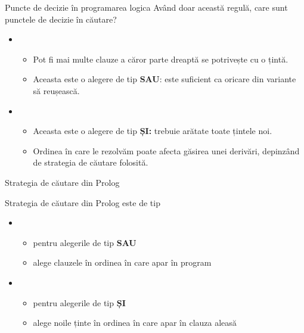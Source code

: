 \documentclass[xcolor=pdftex,romanian,colorlinks]{beamer}
\begin{document}
\begin{frame}{Puncte de decizie în programarea logica}
Având doar această regulă, care sunt punctele de decizie în căutare?
\begin{itemize}
   
  \item {}
  \begin{itemize}
    \item Pot fi mai multe clauze a căror parte dreaptă se potrivește cu o țintă.
    \item Aceasta este o alegere de tip \textbf{SAU}: este suficient ca oricare din variante să reușească.
  \end{itemize}
  
  \medskip  
  \item {}
  \begin{itemize}
    \item Aceasta este o alegere de tip \textbf{ȘI:} trebuie arătate toate țintele noi.
    \item Ordinea în care le rezolvăm poate afecta găsirea unei derivări, depinzând de strategia de căutare folosită.
  \end{itemize}
\end{itemize}
\end{frame}

\begin{frame}{Strategia de căutare din Prolog}

Strategia de căutare din Prolog este de tip 
\medskip
\begin{itemize}
  \item {}
  \begin{itemize}
    \item pentru alegerile de tip \textbf{SAU}
    \item alege clauzele în ordinea în care apar în program
  \end{itemize}
  \medskip
  \item {}
  \begin{itemize}
    \item pentru alegerile de tip \textbf{ȘI}
    \item alege noile ținte în ordinea în care apar în clauza aleasă
  \end{itemize}
\end{itemize}

\end{frame}
\end{document}
